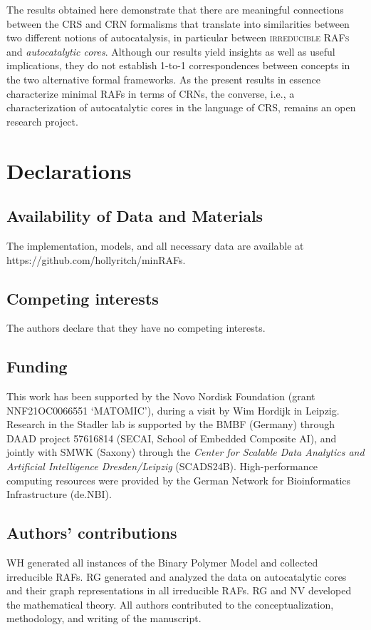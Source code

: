 \documentclass[pdflatex]{sn-jnl}
\theoremstyle{thmstyleone}%
\theoremstyle{examplesty}%
\theoremstyle{thmstylethree}%
\begin{document}
The results obtained here demonstrate that there are meaningful connections 
between the CRS and CRN formalisms that translate into similarities 
between two different notions of autocatalysis, in particular between \textsc{irreducible RAFs} 
and \emph{autocatalytic cores}. Although our results yield insights as well as 
useful implications, they do not establish 1-to-1 correspondences between 
concepts in the two alternative formal frameworks. As the present results in 
essence characterize minimal RAFs in terms of CRNs, the converse, i.e., a 
characterization of autocatalytic cores in the language of CRS, 
remains an open research project.

\section{Declarations}

\subsection{Availability of Data and Materials}

The implementation, models, and all necessary data are available at https://github.com/hollyritch/minRAFs.

\subsection{Competing interests}

The authors declare that they have no competing interests. 

\subsection{Funding}

This work has been supported by the Novo Nordisk Foundation (grant NNF21OC0066551 `MATOMIC'), 
during a visit by Wim Hordijk in Leipzig. Research in the Stadler lab is {supported} by the BMBF (Germany)
through DAAD project 57616814 (SECAI, School of Embedded Composite AI), and jointly with SMWK 
(Saxony) through the \emph{Center for Scalable Data Analytics and Artificial Intelligence Dresden/Leipzig} (SCADS24B).
High-performance computing resources were provided by the German Network for Bioinformatics Infrastructure (de.NBI).

\subsection{Authors' contributions}

WH generated all instances of the Binary Polymer Model and collected irreducible RAFs. RG generated and analyzed the 
data on autocatalytic cores and their graph representations in all irreducible RAFs. RG and NV developed the mathematical 
theory. All authors contributed to the conceptualization, methodology, and writing of the manuscript. 


\end{document}
